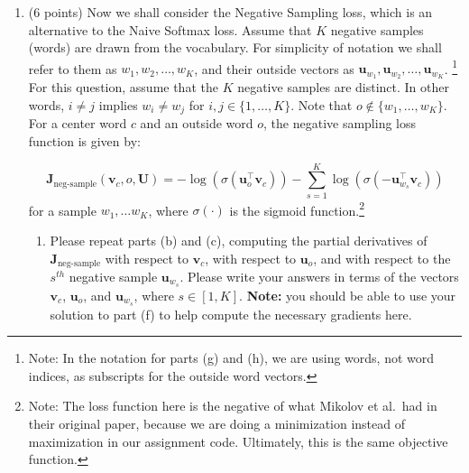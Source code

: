 \documentclass{article}
\newenvironment{answer}{
    {\bf Answer:} \sf \begingroup\color{red}
}{\endgroup}%
\begin{document}
\begin{enumerate}[label=(\alph*)]
Please compute the derivative of $\sigma(x)$ with respect to $x$, where $x$ is a scalar. Hint: you may want to write your answer in terms of $\sigma(x)$.

\begin{shaded}
\begin{answer}

$
\frac{\partial \sigma(x)}{\partial x} &= e^{x}(e^x+1)^{-1}-e^{x}e^{x}(e^x+1)^{-2} \\
        &= e^{x}\left(\frac{(e^x+1)}{(e^x+1)(e^x+1)} - \frac{e^{x}}{(e^x+1)(e^x+1)}\right) \\
        &= \frac{e^{x}}{(e^x+1)(e^x+1)} \\
        &= \frac{e^{x}}{e^x+1}\left(\frac{e^x+1}{e^x+1}-\frac{e^x}{e^x+1}\right) \\
        &= \sigma(x)(1-\sigma(x))
$
\end{answer}
\end{shaded}

\item (6 points) Now we shall consider the Negative Sampling loss, which is an alternative to the Naive Softmax loss.  Assume that $K$ negative samples (words) are drawn from the vocabulary. For simplicity of notation we shall refer to them as $w_1, w_2, \dots, w_K$, and their outside vectors as $\bm u_{w_1}, \bm u_{w_2}, \dots, \bm u_{w_K}$. \footnote{Note: In the notation for parts (g) and (h), we are using words, not word indices, as subscripts for the outside word vectors.} For this question, assume that the $K$ negative samples are distinct. In other words, $i\neq j$ implies $w_i\neq w_j$ for $i,j\in\{1,\dots,K\}$.
Note that $o\notin\{w_1, \dots, w_K\}$. 
For a center word $c$ and an outside word $o$, the negative sampling loss function is given by:

\begin{equation}
\bm J_{\text{neg-sample}}(\bm v_c, o, \bm U) = -\log(\sigma(\bm u_o^\top \bm v_c)) - \sum_{s=1}^K \log(\sigma(-\bm u_{w_s}^\top \bm v_c))
\end{equation}
for a sample $w_1, \ldots w_K$, where $\sigma(\cdot)$ is the sigmoid function.\footnote{Note: The loss function here is the negative of what Mikolov et al.\ had in their original paper, because we are doing a minimization instead of maximization in our assignment code. Ultimately, this is the same objective function.}

\begin{enumerate}[label=(\roman*)]
\item Please repeat parts (b) and (c), computing the partial derivatives of $\bm J_{\text{neg-sample}}$ with respect to $\bm v_c$, with respect to $\bm u_o$, and with respect to the $s^{th}$ negative sample $\bm u_{w_s}$. Please write your answers in terms of the vectors $\bm v_c$, $\bm u_o$, and $\bm u_{w_s}$, where $s \in [1, K]$. \textbf{Note:} you should be able to use your solution to part (f) to help compute the necessary gradients here.


\end{enumerate}
\end{enumerate}
\end{document}
